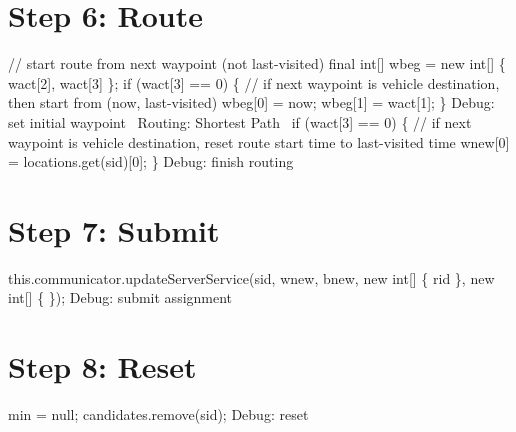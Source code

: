 \section{Step 6: Route}

\nwenddocs{}\endmoddef\nwstartdeflinemarkup{}\nwenddeflinemarkup
// start route from next waypoint (not last-visited)
final int[] wbeg = new int[] \{ wact[2], wact[3] \};
if (wact[3] == 0) \{
  // if next waypoint is vehicle destination, then start from (now, last-visited)
  wbeg[0] = now;
  wbeg[1] = wact[1];
\}
\LA{}Debug: set initial waypoint~{\nwtagstyle{}}\RA{}
\LA{}Routing: Shortest Path~{\nwtagstyle{}}\RA{}
if (wact[3] == 0) \{
  // if next waypoint is vehicle destination, reset route start time to last-visited time
  wnew[0] = locations.get(sid)[0];
\}
\LA{}Debug: finish routing~{\nwtagstyle{}}\RA{}
\nwendcode{}\nwdocspar

\section{Step 7: Submit}

\nwenddocs{}\endmoddef\nwstartdeflinemarkup{}\nwenddeflinemarkup
this.communicator.updateServerService(sid, wnew, bnew,
    new int[] \{ rid \}, new int[] \{ \});
\LA{}Debug: submit assignment~{\nwtagstyle{}}\RA{}
\nwendcode{}\nwdocspar

\section{Step 8: Reset}

\nwenddocs{}\endmoddef\nwstartdeflinemarkup{}\nwenddeflinemarkup
min = null;
candidates.remove(sid);
\LA{}Debug: reset~{\nwtagstyle{}}\RA{}
\nwendcode{}\nwdocspar

